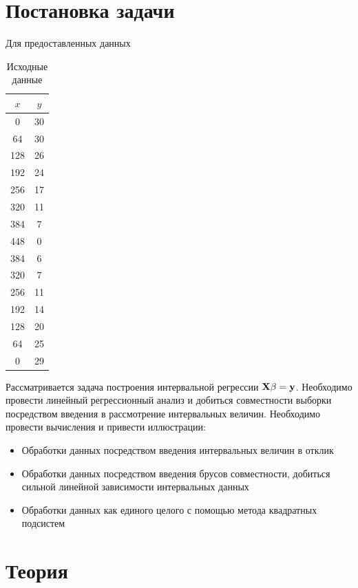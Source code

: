 \documentclass[a4paper]{article}
\begin{document}
\section{Постановка задачи}
Для предоставленных данных 
\begin{table}[H]
    \centering
    \begin{tabular}{|c|c|}
        \hline
         $x$&$y$  \\
         \hline
         0&30\\
         \hline
         64&30\\
         \hline
         128&26\\
         \hline
         192&24\\
         \hline
         256&17\\
         \hline
         320&11\\
         \hline
         384&7\\
         \hline
         448&0\\
         \hline
         384&6\\
         \hline
         320&7\\
         \hline
         256&11\\
         \hline
         192&14\\
         \hline
         128&20\\
         \hline
         64&25\\
         \hline
         0&29\\
         \hline
    \end{tabular}
    \caption{Исходные данные}
    \label{tab:data}
\end{table}
Рассматривается задача построения интервальной регрессии $\mathbf{X}\beta=\mathbf{y}$. Необходимо провести линейный регрессионный анализ и добиться совместности выборки посредством введения в рассмотрение интервальных величин. Необходимо провести вычисления и привести иллюстрации:
\begin{itemize}
    \item Обработки данных посредством введения интервальных величин в отклик
    \item Обработки данных посредством введения брусов совместности, добиться сильной линейной зависимости интервальных данных
    \item Обработки данных как единого целого с помощью метода квадратных подсистем
\end{itemize}
\section{Теория}
\end{document}
